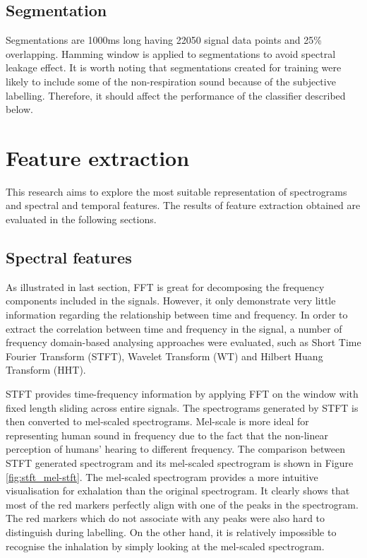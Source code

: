 \subsection{Segmentation}
Segmentations are 1000ms long having 22050 signal data points and 25\% overlapping. Hamming window is applied to segmentations to avoid spectral leakage effect. It is worth noting that segmentations created for training were likely to include some of the non-respiration sound because of the subjective labelling. Therefore, it should affect the performance of the classifier described below. 

\section{Feature extraction}
This research aims to explore the most suitable representation of spectrograms and spectral and temporal features. The results of feature extraction obtained are evaluated in the following sections. 

\subsection{Spectral features}
As illustrated in last section, FFT is great for decomposing the frequency components included in the signals. However, it only demonstrate very little information regarding the relationship between time and frequency. In order to extract the correlation between time and frequency in the signal, a number of frequency domain-based analysing approaches were evaluated, such as Short Time Fourier Transform (STFT), Wavelet Transform (WT) and Hilbert Huang Transform (HHT).

STFT provides time-frequency information by applying FFT on the window with fixed length sliding across entire signals. The spectrograms generated by STFT is then converted to mel-scaled spectrograms. Mel-scale is more ideal for representing human sound in frequency due to the fact that the non-linear perception of humans' hearing to different frequency. The comparison between STFT generated spectrogram and its mel-scaled spectrogram is shown in Figure \ref{fig:stft_mel-stft}. The mel-scaled spectrogram provides a more intuitive visualisation for exhalation than the original spectrogram. It clearly shows that most of the red markers perfectly align with one of the peaks in the spectrogram. The red markers which do not associate with any peaks were also hard to distinguish during labelling. On the other hand, it is relatively impossible to recognise the inhalation by simply looking at the mel-scaled spectrogram. 

